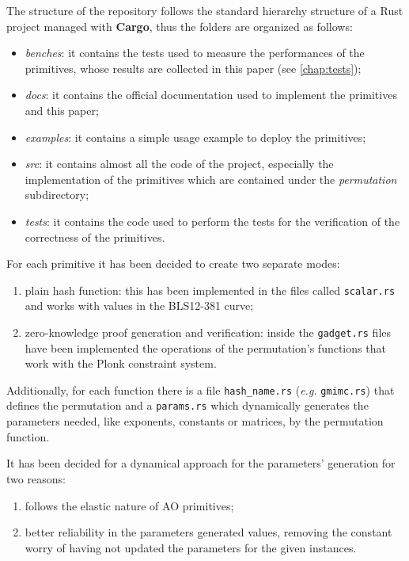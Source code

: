 \documentclass[12pt, a4paper]{report}
\begin{document}
The structure of the repository follows the standard hierarchy structure of a Rust project managed with \textbf{Cargo}, thus the folders are organized as follows:
\begin{itemize}
  \item \textit{benches}: it contains the tests used to measure the performances of the primitives, whose results are collected in this paper (see \autoref{chap:tests});
  \item \textit{docs}: it contains the official documentation used to implement the primitives and this paper;
  \item \textit{examples}: it contains a simple usage example to deploy the primitives;
  \item \textit{src}: it contains almost all the code of the project, especially the implementation of the primitives which are contained under the \textit{permutation} subdirectory;
  \item \textit{tests}: it contains the code used to perform the tests for the verification of the correctness of the primitives.
\end{itemize}

For each primitive it has been decided to create two separate modes:
\begin{enumerate}
  \item plain hash function: this has been implemented in the files called \texttt{scalar.rs} and works with values in the BLS12-381 curve;
  \item zero-knowledge proof generation and verification: inside the \texttt{gadget.rs} files have been implemented the operations of the permutation's functions that work with the \textsf{Plonk} constraint system.
\end{enumerate}
Additionally, for each function there is a file \texttt{hash\_name.rs} (\textsl{e.g.} \texttt{gmimc.rs}) that defines the permutation and a \texttt{params.rs} which dynamically generates the parameters needed, like exponents, constants or matrices, by the permutation function.

It has been decided for a dynamical approach for the parameters' generation for two reasons:
\begin{enumerate}
  \item follows the elastic nature of AO primitives;
  \item better reliability in the parameters generated values, removing the constant worry of having not updated the parameters for the given instances.
\end{enumerate}
\end{document}
